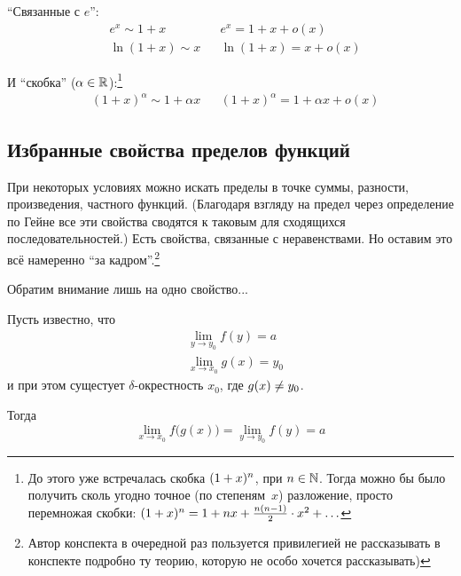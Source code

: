 \documentclass[a4paper,12pt]{article}
\begin{document}
  ``Связанные с $e$'':
  \[
    \begin{aligned}
      &e^x           \sim 1 + x  & &e^x = 1 + x + o(x)\\
      &\ln{(1 + x)}  \sim x      & &\ln{(1 + x)} = x + o(x)
    \end{aligned}
  \]

  И ``скобка'' ($\alpha \hm\in \RR$):\footnote{
    До этого уже встречалась скобка $(1 \hm+ x)^n$, при $n \hm\in \NN$.
    Тогда можно бы было получить сколь угодно точное (по степеням~$x$) разложение, просто перемножая скобки:
    $(1 + x)^n \hm= 1 \hm+ nx \hm+ \frac{n(n - 1)}{2} \hm\cdot x^2 \hm+ \ldots$
  }
  \[
    \begin{aligned}
      &(1 + x)^{\alpha} \sim 1 + \alpha x & &(1 + x)^{\alpha} = 1 + \alpha x + o(x)
    \end{aligned}
  \]


  \subsection{Избранные свойства пределов функций}\label{sec:complex-function}

  При некоторых условиях можно искать пределы в точке суммы, разности, произведения, частного функций.
  (Благодаря взгляду на предел через определение по Гейне все эти свойства сводятся к таковым для сходящихся последовательностей.)
  Есть свойства, связанные с неравенствами.
  Но оставим это всё намеренно ``за кадром''.\footnote{
    Автор конспекта в очередной раз пользуется привилегией не рассказывать в конспекте подробно ту теорию, которую не особо хочется рассказывать)
  }

  Обратим внимание лишь на одно свойство...

  \begin{proposition}
    Пусть известно, что
    \[
      \begin{aligned}
        &\lim_{y \to y_0} f(y) = a\\
        &\lim_{x \to x_0} g(x) = y_0
      \end{aligned}
    \]
    и при этом сущестует $\delta$-окрестность $x_0$, где $g(x) \hm{\not=} y_0$.
    
    Тогда
    \[
      \lim_{x \to x_0} f\bigl(g(x)\bigr) = \lim_{y \to y_0} f(y) = a
    \]
  \end{proposition}
\end{document}
